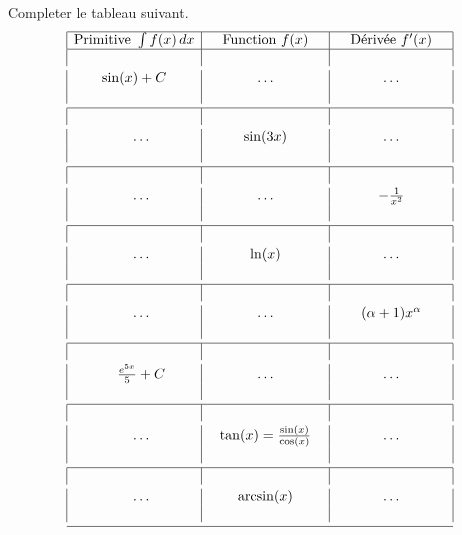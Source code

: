\begin{exercice}\label{exoExosenvrac-0001}

Completer le tableau suivant. 
  \begin{equation}
    \begin{array}{|c|c|c|}\hline 
      \textrm{Primitive } \int f(x)\, dx & \quad\textrm{Function } f(x)\quad &\quad \textrm{D\'eriv\'ee } f'(x)\quad \\\hline 
      \vspace{1mm}&&\\
      \quad\sin(x)+C\quad & \quad\ldots \quad&\quad \ldots \quad\\
      \vspace{1mm}&&\\\hline
      \vspace{1mm}&&\\
      \quad\ldots & \sin(3x) & \ldots \\
      \vspace{1mm}&&\\\hline 
      \vspace{1mm}&&\\
      \quad\ldots & \ldots & -\frac{1}{x^2}\\
      \vspace{1mm}&&\\\hline 
      \vspace{1mm}&&\\
      \quad\ldots & \ln(x) & \ldots \\
      \vspace{1mm}&&\\\hline 
      \vspace{1mm}&&\\
      \quad\ldots & \ldots & \quad(\alpha+1)x^\alpha\quad \\
      \vspace{1mm}&&\\\hline 
      \vspace{1mm}&&\\
      \quad\frac{e^{5x}}{5}+C & \ldots & \ldots \\
      \vspace{1mm}&&\\\hline 
      \vspace{1mm}&&\\
      \quad\ldots  & \tan(x)=\frac{\sin(x)}{\cos(x)} & \ldots \\
      \vspace{1mm}&&\\\hline 
      \vspace{1mm}&&\\
      \quad\ldots  &\quad \arcsin(x)\quad & \ldots \\
      \vspace{1mm}&&\\\hline 
    \end{array}
  \end{equation}
  

  
\end{exercice}
